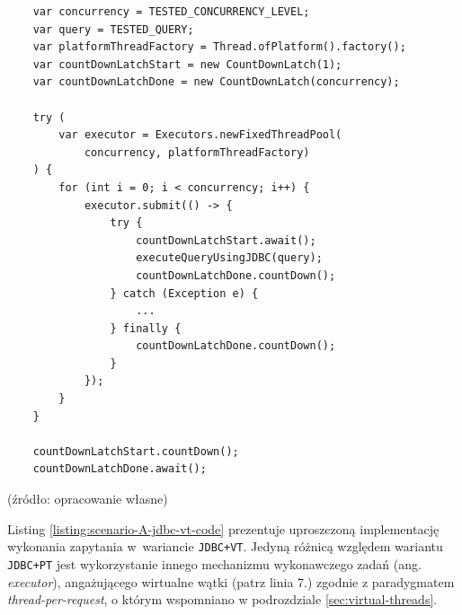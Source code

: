 \begin{listing}[!ht]
    \begin{verbatim}
    var concurrency = TESTED_CONCURRENCY_LEVEL;
    var query = TESTED_QUERY;
    var platformThreadFactory = Thread.ofPlatform().factory();
    var countDownLatchStart = new CountDownLatch(1);
    var countDownLatchDone = new CountDownLatch(concurrency);

    try (
        var executor = Executors.newFixedThreadPool(
            concurrency, platformThreadFactory)
    ) {
        for (int i = 0; i < concurrency; i++) {
            executor.submit(() -> {
                try {
                    countDownLatchStart.await();
                    executeQueryUsingJDBC(query);
                    countDownLatchDone.countDown();
                } catch (Exception e) { 
                    ...
                } finally {
                    countDownLatchDone.countDown();
                }
            });
        }
    }

    countDownLatchStart.countDown();
    countDownLatchDone.await();
    \end{verbatim}
    \vspace{-10pt}
    \caption{Uproszczona implementacja współbieżnego wykonania zapytania w~ramach scenariusza $\mathcal{A}$ w wariancie \texttt{JDBC+PT}}
    \label{listing:scenario-A-jdbc-pt-code}
\end{listing}

\vspace{-25pt}
\begin{center}
    \small{(źródło: opracowanie własne)}
\end{center}

\newpage
Listing \ref{listing:scenario-A-jdbc-vt-code} prezentuje uproszczoną implementację wykonania zapytania w~wariancie \texttt{JDBC+VT}. Jedyną różnicą względem wariantu \texttt{JDBC+PT} jest wykorzystanie innego mechanizmu wykonawczego zadań (ang. \emph{executor}), angażującego wirtualne wątki (patrz linia 7.) zgodnie z paradygmatem \emph{thread-per-request}, o którym wspomniano w podrozdziale \ref{sec:virtual-threads}.

